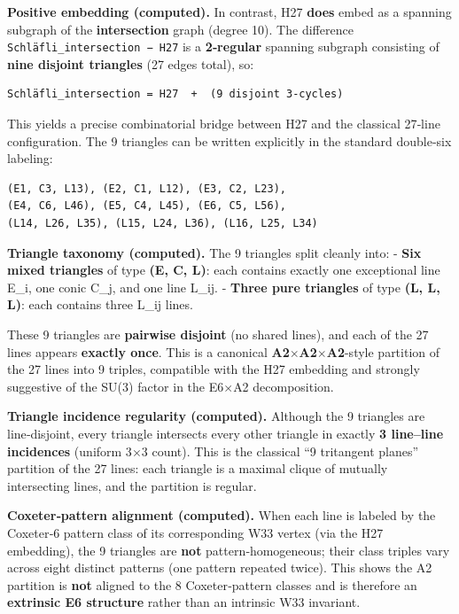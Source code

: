 \documentclass[11pt]{article}
\begin{document}
\textbf{Positive embedding (computed).} In contrast, H27 \textbf{does}
embed as a spanning subgraph of the \textbf{intersection} graph (degree
10). The difference \texttt{Schläfli\_intersection\ −\ H27} is a
\textbf{2‑regular} spanning subgraph consisting of \textbf{nine disjoint
triangles} (27 edges total), so:

\begin{verbatim}
Schläfli_intersection = H27  +  (9 disjoint 3-cycles)
\end{verbatim}

This yields a precise combinatorial bridge between H27 and the classical
27‑line configuration. The 9 triangles can be written explicitly in the
standard double‑six labeling:

\begin{verbatim}
(E1, C3, L13), (E2, C1, L12), (E3, C2, L23),
(E4, C6, L46), (E5, C4, L45), (E6, C5, L56),
(L14, L26, L35), (L15, L24, L36), (L16, L25, L34)
\end{verbatim}

\textbf{Triangle taxonomy (computed).} The 9 triangles split cleanly
into: - \textbf{Six mixed triangles} of type \textbf{(E, C, L)}: each
contains exactly one exceptional line E\_i, one conic C\_j, and one line
L\_ij. - \textbf{Three pure triangles} of type \textbf{(L, L, L)}: each
contains three L\_ij lines.

These 9 triangles are \textbf{pairwise disjoint} (no shared lines), and
each of the 27 lines appears \textbf{exactly once}. This is a canonical
\textbf{A2\ensuremath{\times}A2\ensuremath{\times}A2}-style partition of
the 27 lines into 9 triples, compatible with the H27 embedding and
strongly suggestive of the SU(3) factor in the E6\ensuremath{\times}A2
decomposition.

\textbf{Triangle incidence regularity (computed).} Although the 9
triangles are line‑disjoint, every triangle intersects every other
triangle in exactly \textbf{3 line--line incidences} (uniform
3\ensuremath{\times}3 count). This is the classical ``9 tritangent
planes'' partition of the 27 lines: each triangle is a maximal clique of
mutually intersecting lines, and the partition is regular.

\textbf{Coxeter‑pattern alignment (computed).} When each line is labeled
by the Coxeter‑6 pattern class of its corresponding W33 vertex (via the
H27 embedding), the 9 triangles are \textbf{not} pattern‑homogeneous;
their class triples vary across eight distinct patterns (one pattern
repeated twice). This shows the A2 partition is \textbf{not} aligned to
the 8 Coxeter‑pattern classes and is therefore an \textbf{extrinsic E6
structure} rather than an intrinsic W33 invariant.
\end{document}
